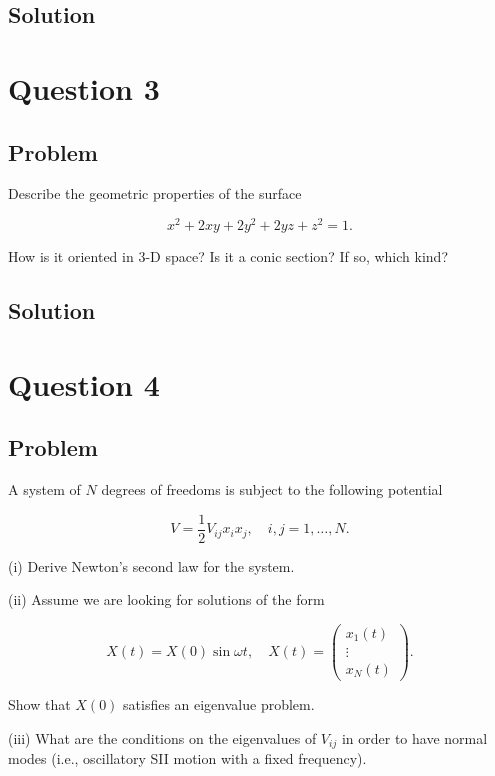 \documentclass[12pt]{article}
\begin{document}
\subsection{Solution}

\newpage
\section{Question 3}

\subsection{Problem}

Describe the geometric properties of the surface

\[
    x^2+2 x y+2 y^2+2 y z+z^2=1 .
\]

How is it oriented in 3-D space? Is it a conic section? If so, which kind?

\subsection{Solution}

\newpage
\section{Question 4}

\subsection{Problem}

A system of \(N\) degrees of freedoms is subject to the following potential

\[
    V=\frac{1}{2} V_{i j} x_i x_j, \quad i, j=1, \ldots, N .
\]

(i) Derive Newton's second law for the system.

(ii) Assume we are looking for solutions of the form

\[
    X(t)=X(0) \sin \omega t, \quad X(t)=\left(\begin{array}{c}
            x_1(t) \\
            \vdots \\
            x_N(t)
        \end{array}\right) .
\]

Show that \(X(0)\) satisfies an eigenvalue problem.

(iii) What are the conditions on the eigenvalues of \(V_{i j}\) in order to have normal modes (i.e., oscillatory SII motion with a fixed frequency).
\end{document}
